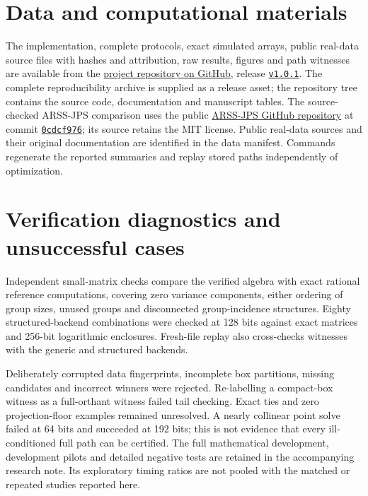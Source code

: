 \documentclass[preprint,11pt,numbers]{elsarticle}
\theoremstyle{remark}\newtheorem{remark}[theorem]{Remark}
\begin{document}
\section*{Data and computational materials}
The implementation, complete protocols, exact simulated arrays, public
real-data source files with hashes and attribution, raw results, figures and
path witnesses are available from the
\href{https://github.com/mgalazka84/certified-mixed-model-selection}{project repository on GitHub},
release \href{https://github.com/mgalazka84/certified-mixed-model-selection/releases/tag/v1.0.1}{\texttt{v1.0.1}}.
The complete reproducibility archive is supplied as a release asset; the
repository tree contains the source code, documentation and manuscript tables.
The source-checked
ARSS-JPS comparison uses the public
\href{https://github.com/mgalazka84/arss-jps-mixed-model-selection}{ARSS-JPS GitHub repository}
at commit
\href{https://github.com/mgalazka84/arss-jps-mixed-model-selection/tree/0cdcf976178be7ed00af4b0737a7ed97540786a4}{\texttt{0cdcf976}};
its source retains the MIT license. Public real-data sources and their original
documentation are identified in the data manifest. Commands regenerate the
reported summaries and replay stored paths independently of optimization.

\appendix
\section{Verification diagnostics and unsuccessful cases}
Independent small-matrix checks compare the verified algebra with exact
rational reference computations, covering zero variance components, either
ordering of group sizes, unused groups and disconnected group-incidence
structures. Eighty structured-backend combinations were checked at 128 bits
against exact matrices and 256-bit logarithmic enclosures. Fresh-file replay
also cross-checks witnesses with the generic and structured backends.

Deliberately corrupted data fingerprints, incomplete box partitions, missing
candidates and incorrect winners were rejected. Re-labelling a compact-box
witness as a full-orthant witness failed tail checking. Exact ties and zero
projection-floor examples remained unresolved. A nearly collinear point solve
failed at 64 bits and succeeded at 192 bits; this is not evidence that every
ill-conditioned full path can be certified. The full mathematical development,
development pilots and detailed negative tests are retained in the accompanying
research note. Its exploratory timing ratios are not pooled with the matched
or repeated studies reported here.
\end{document}
